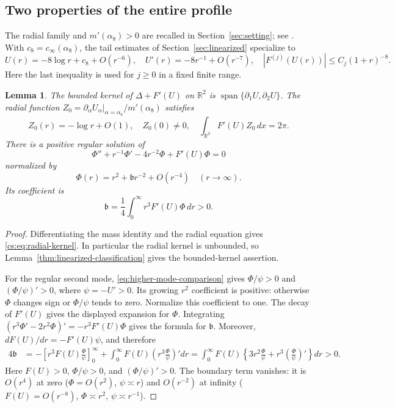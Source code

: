\documentclass[11pt,reqno]{amsart}
\numberwithin{equation}{section}
\newtheorem{lemma}[theorem]{Lemma}
\theoremstyle{definition}
\theoremstyle{remark}
\newcommand{\R}{\mathbb R}
\newcommand{\dd}{\,dx}
\begin{document}
\subsection{Two properties of the entire profile}

The radial family and $m'(\alpha_8)>0$ are recalled in
Section~\ref{sec:setting}; see \cite[pp.~840--841 and Lemma~2.4]{CKL}.
With $c_8=c_\infty(\alpha_8)$, the tail estimates of
Section~\ref{sec:linearized} specialize to
\begin{equation}\label{cs:eq:tails}
 U(r)=-8\log r+c_8+O(r^{-6}),\quad
 U'(r)=-8r^{-1}+O(r^{-7}),\quad
 |F^{(j)}(U(r))|\le C_j(1+r)^{-8}.
\end{equation}
Here the last inequality is used for $j\ge0$ in a fixed finite range.

\begin{lemma}\label{cs:lem:profile}
The bounded kernel of $\Delta+F'(U)$ on $\R^2$ is
$\operatorname{span}\{\partial_1U,\partial_2U\}$. The radial function
$Z_0=\left.\partial_\alpha U_\alpha\right|_{\alpha=\alpha_8}/m'(\alpha_8)$ satisfies
\begin{equation}\label{cs:eq:radial-kernel}
 Z_0(r)=-\log r+O(1),\quad Z_0(0)\ne0,\quad
 \int_{\R^2}F'(U)Z_0\dd=2\pi.
\end{equation}
There is a positive regular solution of
\begin{equation}\label{cs:eq:phi}
 \Phi''+r^{-1}\Phi'-4r^{-2}\Phi+F'(U)\Phi=0
\end{equation}
normalized by
\[
 \Phi(r)=r^2+\mathfrak b r^{-2}+O(r^{-4})\quad(r\to\infty).
\]
Its coefficient is
\begin{equation}\label{cs:eq:beta}
 \mathfrak b=\frac14\int_0^\infty r^3F'(U)\Phi\,dr>0.
\end{equation}
\end{lemma}

\begin{proof}
Differentiating the mass identity and the radial equation gives
\eqref{cs:eq:radial-kernel}. In particular the radial kernel is
unbounded, so Lemma~\ref{thm:linearized-classification} gives the
bounded-kernel assertion.

For the regular second mode, \eqref{eq:higher-mode-comparison} gives
$\Phi/\psi>0$ and $(\Phi/\psi)'>0$, where $\psi=-U'>0$.
Its growing $r^2$ coefficient is positive: otherwise $\Phi$ changes
sign or $\Phi/\psi$ tends to zero. Normalize this coefficient to one.
The decay of $F'(U)$ gives the displayed expansion for $\Phi$.
Integrating
\((r^3\Phi'-2r^2\Phi)'=-r^3F'(U)\Phi\)
gives the formula for $\mathfrak b$. Moreover,
$d F(U)/dr=-F'(U)\psi$, and therefore
\begin{align*}
 4\mathfrak b
 &=-\left[r^3F(U)\frac{\Phi}{\psi}\right]_0^\infty
   +\int_0^\infty F(U)
              \left(r^3\frac{\Phi}{\psi}\right)'dr =\int_0^\infty F(U)
       \left\{3r^2\frac{\Phi}{\psi}
                +r^3\left(\frac{\Phi}{\psi}\right)'\right\}dr>0.
\end{align*}
Here $F(U)>0$, $\Phi/\psi>0$, and $(\Phi/\psi)'>0$.
The boundary term vanishes: it is $O(r^4)$ at zero
($\Phi=O(r^2)$, $\psi\asymp r$) and $O(r^{-2})$ at infinity
($F(U)=O(r^{-8})$, $\Phi\asymp r^2$, $\psi\asymp r^{-1}$).
\end{proof}
\end{document}
